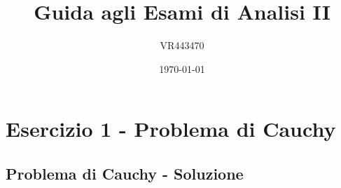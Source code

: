 \documentclass[a4paper]{article}
\begin{document}
	\author{VR443470}
	\title{Guida agli Esami di Analisi II}
	\date{\printdayoff\today}
	\maketitle

	\newpage

	\tableofcontents

	\newpage

	\section{Esercizio 1 - Problema di Cauchy}

	\subsection{Problema di Cauchy - Soluzione}
\end{document}

